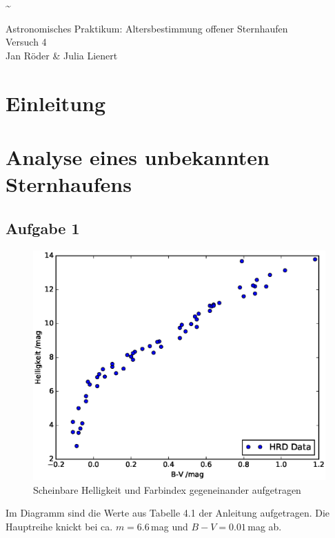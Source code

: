 \documentclass[12pt]{article}
\begin{document}
	\pagestyle{empty}
	\textasciitilde

\begin{titlepage}
	\centering
	\bigskip
	\huge{Astronomisches Praktikum: Altersbestimmung offener Sternhaufen}\\
	\bigskip
	\large{Versuch 4}\\
	\bigskip
	\large{Jan R\"{o}der \& Julia Lienert}
	\bigskip
	\tableofcontents
\end{titlepage}

\pagebreak


\section{Einleitung}

\section{Analyse eines unbekannten Sternhaufens}

\subsection{Aufgabe 1}

\begin{figure} [h]
	\centering
	\includegraphics[width=1\textwidth]{hrd_notitle.eps}
	\caption{Scheinbare Helligkeit und Farbindex gegeneinander aufgetragen}
	\label{fig:hrd_unknown}
\end{figure}

Im Diagramm sind die Werte aus Tabelle 4.1 der Anleitung aufgetragen. Die Hauptreihe knickt bei ca. $m=6.6$\,mag und $B-V=0.01$\,mag ab.
\end{document}
